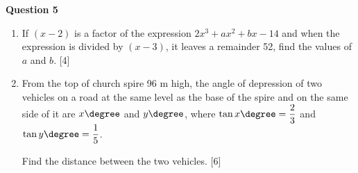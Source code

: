 \noindent
\textbf{Question 5}
\begin{enumerate}[label=(\roman*)]

    \item If $(x-2)$ is a factor of the expression 
        $2x^3 + ax^2 + bx - 14$ and when the expression is divided by 
        $(x-3)$, it leaves a remainder 52, find the values of 
        $a$ and $b$. \hfill [4]

    \item From the top of church spire 96 m high, the angle of 
        depression of two vehicles on a road at the same level
        as the base of the spire and on the same side of it are 
        $x \degree$ and $y \degree$, where 
        $\tan x \degree = \dfrac{2}{3}$ and 
        $\tan y \degree = \dfrac{1}{5}$.
        
        Find the distance between the two vehicles. \hfill [6]

\end{enumerate}


